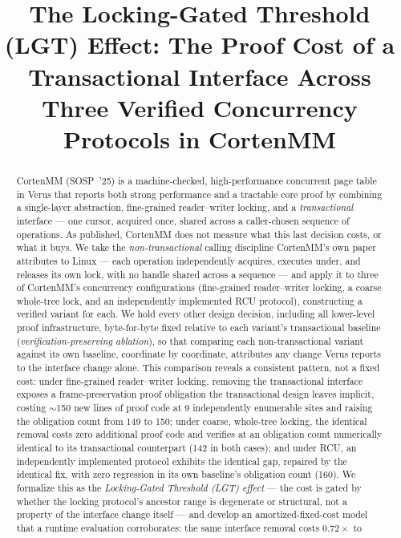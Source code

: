 \documentclass[10pt]{article}
\title{\bf The Locking-Gated Threshold (LGT) Effect:
The Proof Cost of a Transactional Interface Across Three
Verified Concurrency Protocols in CortenMM}
\author{}
\date{}
\begin{document}
\sloppy
\maketitle

\begin{abstract}
CortenMM (SOSP~'25) is a machine-checked, high-performance concurrent
page table in Verus that reports both strong performance and a
tractable core proof by combining a single-layer abstraction,
fine-grained reader--writer locking, and a \emph{transactional}
interface --- one cursor, acquired once, shared across a caller-chosen
sequence of operations. As published, CortenMM does not measure what
this last decision costs, or what it buys. We take the
\emph{non-transactional} calling discipline CortenMM's own paper
attributes to Linux --- each operation independently acquires,
executes under, and releases its own lock, with no handle shared
across a sequence --- and apply it to three of CortenMM's concurrency
configurations (fine-grained reader--writer locking, a coarse
whole-tree lock, and an independently implemented RCU protocol),
constructing a verified variant for each. We hold every other design
decision, including all lower-level proof infrastructure, byte-for-byte
fixed relative to each variant's transactional baseline
(\emph{verification-preserving ablation}), so that comparing each
non-transactional variant against its own baseline, coordinate by
coordinate, attributes any change Verus reports to the interface
change alone. This comparison reveals a consistent pattern, not a
fixed cost: under fine-grained reader--writer locking, removing the
transactional interface exposes a frame-preservation proof obligation
the transactional design leaves implicit, costing $\sim$150 new lines
of proof code at 9 independently enumerable sites and raising the
obligation count from 149 to 150; under coarse, whole-tree locking,
the identical removal costs zero additional proof code and verifies at
an obligation count numerically identical to its transactional
counterpart (142 in both cases); and under RCU, an independently
implemented protocol exhibits the identical gap, repaired by the
identical fix, with zero regression in its own baseline's obligation
count (160). We formalize this as the \emph{Locking-Gated Threshold
(LGT) effect} --- the cost is
gated by whether the locking protocol's ancestor range is degenerate
or structural, not a property of the interface change itself --- and
develop an amortized-fixed-cost model that a runtime evaluation
corroborates: the same interface removal costs $0.72\times$ to

\end{abstract}
\end{document}
